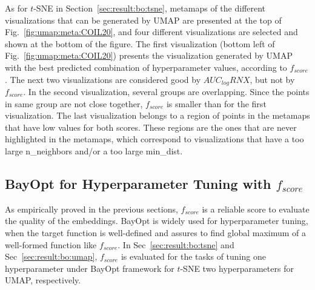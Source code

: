 As for $t$-SNE in Section~\ref{sec:result:bo:tsne}, metamaps of the different visualizations that can be generated by UMAP are presented at the top of Fig.~\ref{fig:umap:meta:COIL20}, and four different visualizations are selected and shown at the bottom of the figure.
The first visualization (bottom left of Fig.~\ref{fig:umap:meta:COIL20}) presents the visualization generated by UMAP with the best predicted combination of hyperparameter values, according to $f_{score}$.
The next two visualizations are considered good by $AUC_{log}RNX$, but not by $f_{score}$.
In the second visualization, several groups are overlapping. Since the points in same group are not close together, $f_{score}$ is smaller than for the first visualization.
The last visualization belongs to a region of points in the metamaps that have low values for both scores.
These regions are the ones that are never highlighted in the metamaps, which correspond to visualizations that have a too large {n\_neighbors} and/or a too large {min\_dist}. 

\subsection{BayOpt for Hyperparameter Tuning with $f_{score}$}\label{sec:result:bo}
As empirically proved in the previous sections, $f_{score}$ is a reliable score to evaluate the quality of the embeddings.
BayOpt is widely used for hyperparameter tuning, when the target function is well-defined and assures to find global maximum of a well-formed function like $f_{score}$.
In Sec~\ref{sec:result:bo:tsne} and Sec~\ref{sec:result:bo:umap}, $f_{score}$ is evaluated for the tasks of tuning one hyperparameter under BayOpt framework for $t$-SNE two hyperparameters for UMAP, respectively.

